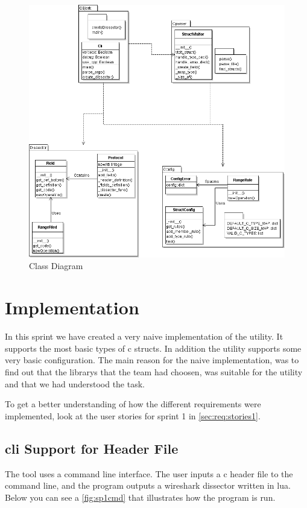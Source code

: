 \begin{figure}[!htb]
	\center
	\includegraphics[width=\textwidth]{./sprints/img/class_diagram_s1}
	\caption{Class Diagram\label{fig:sp1_class}}
\end{figure}


\section{Implementation}
\label{sec:sp1:impl}
In this sprint we have created a very naive implementation of the \gls{utility}. It
supports the most basic types of \Gls{c} \glspl{struct}. In addition the \gls{utility} supports
some very basic configuration. The main reason for the naive implementation, 
was to find out that the \glspl{library} that the team had choosen, was suitable for 
the \gls{utility} and that we had understood the task.

To get a better understanding of how the different requirements were implemented,
look at the user stories for sprint 1 in \autoref{sec:req:stories1}.


\subsection{\gls{cli} Support for Header File}
The tool uses a command line interface. The user inputs a \Gls{c} \gls{header} file to the 
command line, and the program outputs a \Gls{wireshark} \gls{dissector} written in \Gls{lua}. 
Below you can see a \autoref{fig:sp1cmd} that illustrates how the program is 
run. 


